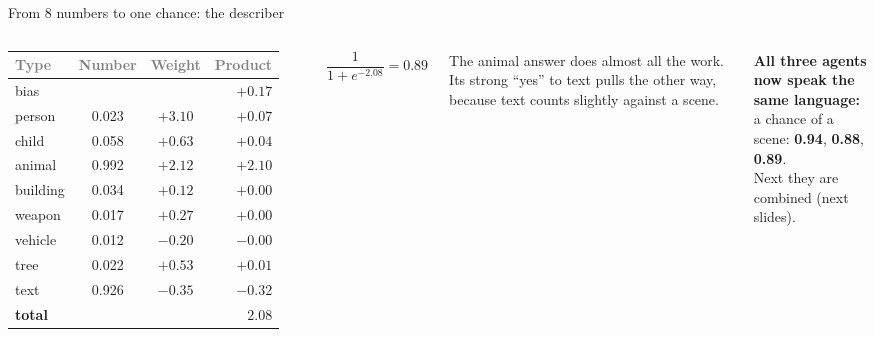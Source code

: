 \documentclass[aspectratio=169,11pt]{beamer}
\renewcommand{\arraystretch}{1.3}
\newcommand{\h}[1]{\textcolor{grey}{#1}}
\begin{document}
\begin{frame}{From 8 numbers to one chance: the describer}
\begin{columns}[T]
\footnotesize\renewcommand{\arraystretch}{1.12}
\begin{tabular}{@{}l c c r@{}}
\toprule
\h{Type} & \h{Number} & \h{Weight} & \h{Product}\\
\midrule
bias & & & $+0.17$\\
person & 0.023 & $+3.10$ & $+0.07$\\
child & 0.058 & $+0.63$ & $+0.04$\\
animal & 0.992 & $+2.12$ & $\mathbf{+2.10}$\\
building & 0.034 & $+0.12$ & $+0.00$\\
weapon & 0.017 & $+0.27$ & $+0.00$\\
vehicle & 0.012 & $-0.20$ & $-0.00$\\
tree & 0.022 & $+0.53$ & $+0.01$\\
text & 0.926 & $-0.35$ & $-0.32$\\
\midrule
\textbf{total} & & & $\mathbf{2.08}$\\
\bottomrule
\end{tabular}
\[ \frac{1}{1 + e^{-2.08}} = \mathbf{0.89} \]

\vspace{0.2cm}
The animal answer does almost all the work. Its strong ``yes'' to text pulls the other way, because text counts slightly against a scene.

\vspace{0.3cm}
\textbf{All three agents now speak the same language:}\\
a chance of a scene: \textbf{0.94}, \textbf{0.88}, \textbf{0.89}.\\
Next they are combined (next slides).
\end{columns}
\end{frame}
\end{document}
